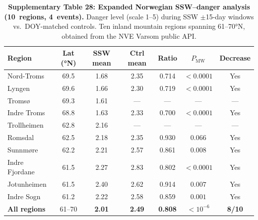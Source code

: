 \documentclass[11pt,letterpaper]{article}
\begin{document}
\begin{table}[htbp]
\caption{\textbf{Supplementary Table 28: Expanded Norwegian SSW--danger analysis (10~regions, 4~events).}
Danger level (scale 1--5) during SSW $\pm$15-day windows vs.\ DOY-matched controls. Ten inland mountain regions spanning 61--70°N, obtained from the NVE Varsom public API.}
\label{tab:norway_expanded}
\small
\begin{tabular}{lcccccc}
\toprule
Region & Lat (°N) & SSW mean & Ctrl mean & Ratio & $P_{\mathrm{MW}}$ & Decrease \\
\midrule
Nord-Troms & 69.5 & 1.68 & 2.35 & 0.714 & $< 0.0001$ & Yes \\
Lyngen & 69.6 & 1.66 & 2.30 & 0.719 & $< 0.0001$ & Yes \\
Tromsø & 69.3 & 1.61 & --- & --- & --- & --- \\
Indre Troms & 68.8 & 1.63 & 2.33 & 0.700 & $< 0.0001$ & Yes \\
Trollheimen & 62.8 & 2.16 & --- & --- & --- & --- \\
Romsdal & 62.5 & 2.18 & 2.35 & 0.930 & $0.066$ & Yes \\
Sunnmøre & 62.2 & 2.21 & 2.57 & 0.861 & $0.008$ & Yes \\
Indre Fjordane & 61.5 & 2.27 & 2.83 & 0.802 & $< 0.0001$ & Yes \\
Jotunheimen & 61.5 & 2.40 & 2.62 & 0.914 & $0.007$ & Yes \\
Indre Sogn & 61.2 & 2.22 & 2.58 & 0.859 & $0.001$ & Yes \\
\midrule
\textbf{All regions} & 61--70 & \textbf{2.01} & \textbf{2.49} & \textbf{0.808} & $< 10^{-6}$ & \textbf{8/10} \\
\bottomrule
\end{tabular}
\end{table}
\end{document}
